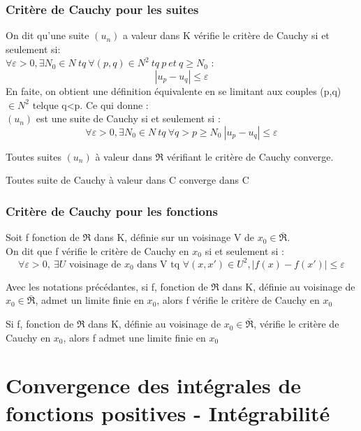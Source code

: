 \subsubsection{Critère de Cauchy pour les suites}
\begin{enon}
On dit qu'une suite $(u_n)$ a valeur dans K vérifie le critère de Cauchy si et seulement si: \\
$\forall \varepsilon > 0, \exists N_0 \in N~ tq~ \forall (p,q) \in N^2~ tq~ p~ et~ q \geq N_0$ :
$$|u_p-u_q| \leq \varepsilon$$
En faite, on obtient une définition équivalente en se limitant aux couples (p,q)$\in N^2$ telque q<p. Ce qui donne : \\
$(u_n)$ est une suite de Cauchy si et seulement si :
$$\forall \varepsilon > 0, \exists N_0 \in N~ tq~ \forall q>p\geq N_0~ |u_p-u_q| \leq \varepsilon$$
\end{enon}
\begin{prop}
Toutes suites $(u_n)$ à valeur dans $\Re$ vérifiant le critère de Cauchy converge.
\end{prop}
\begin{prop}
 Toutes suite de Cauchy à valeur dans C converge dans C
\end{prop}
\subsubsection{Critère de Cauchy pour les fonctions}
\begin{de}
Soit f fonction de $\Re$ dans K, définie sur un voisinage V de $x_0 \in \bar{\Re}$.\\
On dit que f vérifie le critère de Cauchy en $x_0$ si et seulement si :
$$\forall \varepsilon > 0,~ \exists U \mbox{ voisinage de }x_0 \mbox{ dans V tq } \forall(x,x')\in U^2, |f(x)-f(x')| \leq \varepsilon$$
\end{de}
\begin{prop}
Avec les notations précédantes, si f, fonction de $\Re$ dans K, définie au voisinage de $x_0 \in \bar{\Re}$, admet un limite finie en $x_0$, alors f vérifie le critère de Cauchy en $x_0$
\end{prop}
\begin{prop}
Si f, fonction de $\Re$ dans K, définie au voisinage de $x_0 \in \bar{\Re}$, vérifie le critère de Cauchy en $x_0$, alors f admet une limite finie en $x_0$
\end{prop}
\section{Convergence des intégrales de fonctions positives - Intégrabilité}
